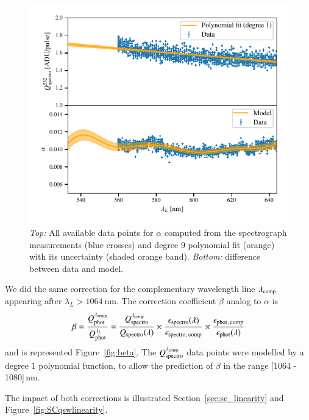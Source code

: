 \begin{figure}[h]
    \centering
    \includegraphics[width=\columnwidth]{fig/alpha_532_qswMAX.pdf}
    \caption{\textit{Top:} All available data points for $\alpha$ computed from the spectrograph measurements (blue crosses) and degree 9 polynomial fit (orange) with its uncertainty (shaded orange band). \textit{Bottom:} difference between data and model.}
    \label{fig:alpha_532}
\end{figure}


We did the same correction for the complementary wavelength line $\lambda_{\rm comp}$ appearing after $\lambda_L > \SI{1064}{\nm}$. The correction coefficient $\beta$ analog to $\alpha$ is
\begin{equation}
    \beta = \frac{Q_{\mathrm{phot}}^{\lambda_{\rm comp}}}{Q_{\mathrm{phot}}^{\lambda_L}} = \frac{Q_{\mathrm{spectro}}^{\lambda_{\rm comp}}}{Q_{\mathrm{spectro}}(\lambda)} \times \frac{\epsilon_{\mathrm{spectro}}(\lambda)}{\epsilon_{\mathrm{spectro}}{}_{\mathrm{, \, comp}}} \times \frac{\epsilon_{\mathrm{phot}}{}_{\mathrm{, \, comp}}}{\epsilon_{\mathrm{phot}}(\lambda)}  
    \label{eq:beta}
\end{equation}
and is represented Figure~\ref{fig:beta}. The $Q_{\mathrm{spectro}}^{\lambda_{\rm comp}}$ data points were modelled by a degree 1 polynomial function, to allow the prediction of $\beta$ in the range [1064 - 1080]\,nm.

The impact of both corrections is illustrated Section~\ref{sec:sc_linearity} and Figure~\ref{fig:SCqswlinearity}.


